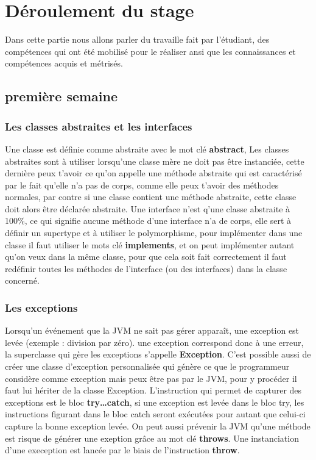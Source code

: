 \documentclass[12pt]{article}
\begin{document}
\section{Déroulement du stage}

Dans cette partie nous allons parler du travaille fait par l'étudiant, des compétences qui ont été mobilisé pour le réaliser ansi que les connaissances et compétences acquis et métrisés.

\subsection{première semaine}

\subsubsection{Les classes abstraites et les interfaces}

Une classe est définie comme abstraite avec le mot clé \textbf{abstract}, Les classes abstraites sont à utiliser lorsqu'une classe mère ne doit pas être instanciée, cette dernière peux t'avoir ce qu'on appelle une méthode abstraite qui est caractérisé par le fait qu'elle n'a pas de corps, comme elle peux t'avoir des méthodes normales, par contre si une classe contient une méthode abstraite, cette classe doit alors être déclarée abstraite.\newline
Une interface n'est q'une classe abstraite à 100\%, ce qui signifie aucune méthode d'une interface n'a de corps, elle sert à définir un supertype et à utiliser le polymorphisme, pour implémenter dans une classe il faut utiliser le mots clé \textbf{implements}, et on peut implémenter autant qu'on veux dans la même classe, pour que cela soit fait correctement il faut redéfinir toutes les méthodes de l'interface (ou des interfaces) dans la classe concerné.

\newpage
\subsubsection{Les exceptions}
Lorsqu'un événement que la JVM ne sait pas gérer apparaît, une exception est levée (exemple : division par zéro). une exception correspond donc à une erreur, la superclasse qui gère les exceptions s'appelle \textbf{Exception}. C'est possible aussi de créer une classe d'exception personnalisée qui génère ce que le programmeur considère comme exception mais peux être pas par le JVM, pour y procéder il faut lui hériter de la classe Exception.\newline
L'instruction qui permet de capturer des exceptions est le bloc \textbf{try{…}catch{}}, si une exception est levée dans le bloc try, les instructions figurant dans le bloc catch seront exécutées pour autant que celui-ci capture la bonne exception levée. On peut aussi prévenir la JVM qu'une méthode est risque de générer une exeption grâce au mot clé \textbf{throws}. Une instanciation d'une exeception est lancée par le biais de l'instruction \textbf{throw}.
\end{document}
